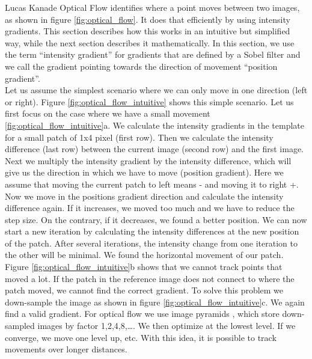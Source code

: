 \documentclass[11pt,a4paper,titlepage,oneside]{report}
\begin{document}
Lucas Kanade Optical Flow identifies where a point moves between two images, as shown in figure \ref{fig:optical_flow}. It does that efficiently by using intensity gradients. This section describes how this works in an intuitive but simplified way, while the next section describes it mathematically. In this section, we use the term ``intensity gradient'' for gradients that are defined by a Sobel filter and we call the gradient pointing towards the direction of movement ``position gradient''.\\
Let us assume the simplest scenario where we can only move in one direction (left or right). Figure \ref{fig:optical_flow_intuitive} shows this simple scenario. Let us first focus on the case where we have a small movement \ref{fig:optical_flow_intuitive}a. We calculate the intensity gradients in the template for a small patch of 1x4 pixel (first row). Then we calculate the intensity difference (last row) between the current image (second row) and the first image. Next we multiply the intensity gradient by the intensity difference, which will give us the direction in which we have to move (position gradient). Here we assume that moving the current patch to left means - and moving it to right +. Now we move in the positions gradient direction and calculate the intensity difference again. If it increases, we moved too much and we have to reduce the step size. On the contrary, if it decreases, we found a better position. We can now start a new iteration by calculating the intensity differences at the new position of the patch. After several iterations, the intensity change from one iteration to the other will be minimal. We found the horizontal movement of our patch.\\
Figure \ref{fig:optical_flow_intuitive}b shows that we cannot track points that moved a lot. If the patch in the reference image does not connect to where the patch moved, we cannot find the correct gradient. To solve this problem we down-sample the image as shown in figure \ref{fig:optical_flow_intuitive}c. We again find a valid gradient. For optical flow we use image pyramids \cite{rvc}, which store down-sampled images by factor 1,2,4,8,\dots. We then optimize at the lowest level. If we converge, we move one level up, etc. With this idea, it is possible to track movements over longer distances.
\end{document}
